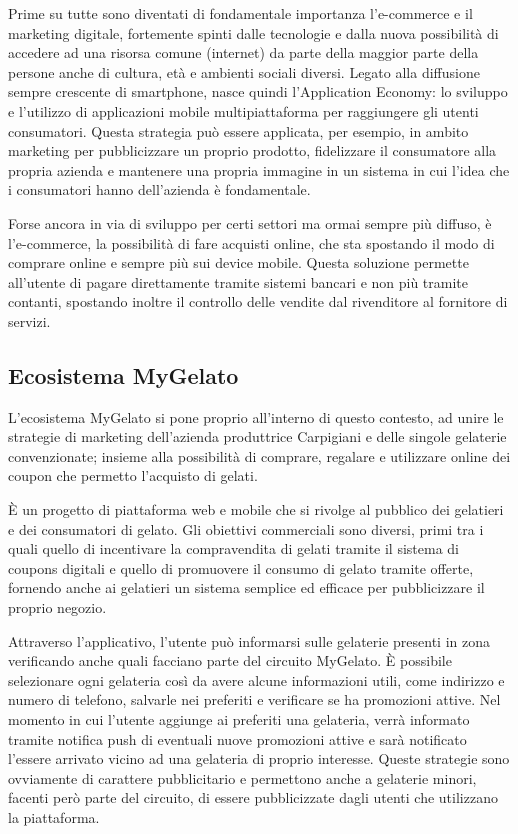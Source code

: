 Prime su tutte sono diventati di fondamentale importanza l'e-commerce e il marketing digitale, fortemente spinti dalle tecnologie e dalla nuova possibilità di accedere ad una risorsa comune (internet) da parte della maggior parte della persone anche di cultura, età e ambienti sociali diversi.
Legato alla diffusione sempre crescente di smartphone, nasce quindi l'Application Economy: lo sviluppo e l'utilizzo di applicazioni mobile multipiattaforma per raggiungere gli utenti consumatori.
Questa strategia può essere applicata, per esempio, in ambito marketing per pubblicizzare un proprio prodotto, fidelizzare il consumatore alla propria azienda e mantenere una propria immagine in un sistema in cui l'idea che i consumatori hanno dell'azienda è fondamentale.

Forse ancora in via di sviluppo per certi settori ma ormai sempre più diffuso, è l'e-commerce, la possibilità di fare acquisti online, che sta spostando il modo di comprare online e sempre più sui device mobile. Questa soluzione permette all'utente di pagare direttamente tramite sistemi bancari e non più tramite contanti, spostando inoltre il controllo delle vendite dal rivenditore al fornitore di servizi.

\subsection{Ecosistema MyGelato}

L'ecosistema MyGelato si pone proprio all'interno di questo contesto, ad unire le strategie di marketing dell'azienda produttrice Carpigiani e delle singole gelaterie convenzionate; insieme alla possibilità di comprare, regalare e utilizzare online dei coupon che permetto l'acquisto di gelati.

È un progetto di piattaforma web e mobile che si rivolge al pubblico dei gelatieri e dei consumatori di gelato. Gli obiettivi commerciali sono diversi, primi tra i quali quello di incentivare la compravendita di gelati tramite il sistema di coupons digitali e quello di promuovere il consumo di gelato tramite offerte, fornendo anche ai gelatieri un sistema semplice ed efficace per pubblicizzare il proprio negozio.

Attraverso l'applicativo, l'utente può informarsi sulle gelaterie presenti in zona verificando anche quali facciano parte del circuito MyGelato.
È possibile selezionare ogni gelateria così da avere alcune informazioni utili, come indirizzo e numero di telefono, salvarle nei preferiti e verificare se ha promozioni attive.
Nel momento in cui l'utente aggiunge ai preferiti una gelateria, verrà informato tramite notifica push di eventuali nuove promozioni attive e sarà notificato l'essere arrivato vicino ad una gelateria di proprio interesse.
Queste strategie sono ovviamente di carattere pubblicitario e permettono anche a gelaterie minori, facenti però parte del circuito, di essere pubblicizzate dagli utenti che utilizzano la piattaforma.

